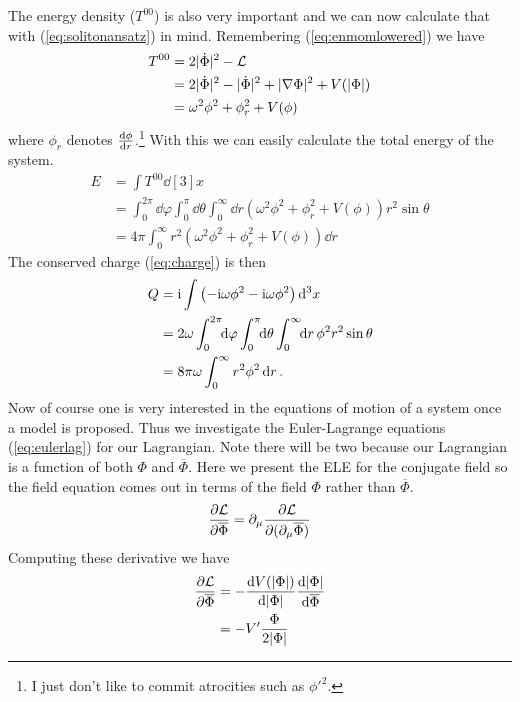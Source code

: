 The energy density (\(T^{00}\)) is also very important and we can now calculate
that with (\ref{eq:solitonansatz}) in mind. Remembering (\ref{eq:enmomlowered})
we have
\begin{align}
    T^{00} & = 2|\dot{\Phi}|^2 - \mathcal{L} \\
           & = 2|\dot{\Phi}|^2 - |\dot{\Phi}|^2 + |\nabla\Phi|^2 + V(|\Phi|) \\
           & = \omega^2\phi^2 + \phi_r^2 + V(\phi)
\end{align}
where \(\phi_r\) denotes \(\dv{\phi}{r}\).\footnote{I just don't like to commit
atrocities such as \(\phi'^2\).} With this we can easily calculate the total
energy of the system.
\begin{align}
    E & = \int T^{00}\dd[3]{x} \\
      & = \int_0^{2\pi}\!\!\dd{\varphi}\int_0^\pi\!\!\dd{\theta}\int_0^\infty\!\!\dd{r}\left(\omega^2\phi^2 + \phi_r^2 + V(\phi)\right)r^2\sin{\theta} \\
      & = 4\pi\int_0^\infty r^2\left(\omega^2\phi^2 + \phi_r^2 + V(\phi)\right)\dd{r} \label{eq:nospinenergy}
\end{align}
The conserved charge (\ref{eq:charge}) is then
\begin{align}
    Q & = \mathrm{i}\int\left(-\mathrm{i}\omega\phi^2 - \mathrm{i}\omega\phi^2\right)\dd[3]{x} \\
      & = 2\omega\int_0^{2\pi}\!\!\dd{\varphi}\int_0^\pi\!\!\dd{\theta}\int_0^\infty\!\!\dd{r}\phi^2 r^2\sin{\theta} \\
      & = 8\pi\omega\int_0^\infty r^2\phi^2\dd{r} \label{eq:nospincharge}.
\end{align}
Now of course one is very interested in the equations of motion of a system once
a model is proposed. Thus we investigate the Euler-Lagrange equations
(\ref{eq:eulerlag}) for our Lagrangian. Note there will be two because our
Lagrangian is a function of both \(\Phi\) and \(\overline{\Phi}\). Here we
present the ELE for the conjugate field so the field equation comes out in terms
of the field \(\Phi\) rather than \(\overline{\Phi}\).
\begin{equation}
    \pdv{\mathcal{L}}{\overline{\Phi}} = \partial_\mu\pdv{\mathcal{L}}{(\partial_\mu\overline{\Phi})}
\end{equation}
Computing these derivative we have
\begin{align}
    \pdv{\mathcal{L}}{\overline{\Phi}} & = -\dv{V(|\Phi|)}{|\Phi|}\dv{|\Phi|}{\overline{\Phi}} \\
                                & = -V'\frac{\Phi}{2|\Phi|}
\end{align}
